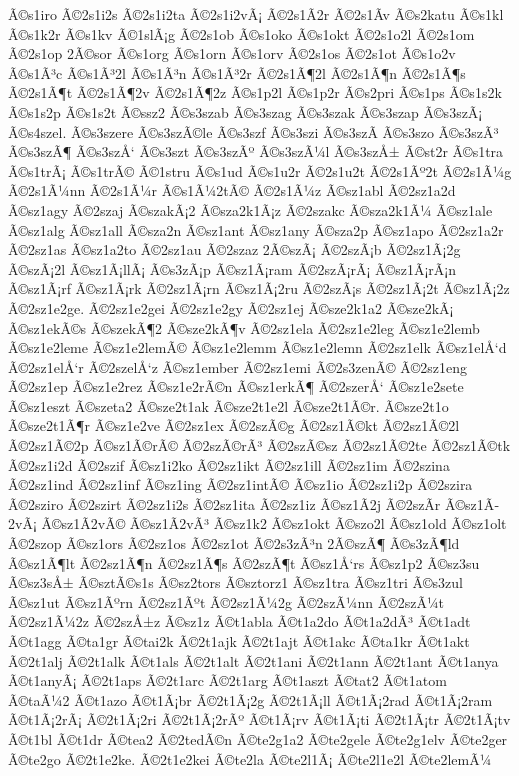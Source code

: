 {Ã©s1iro
Ã©2s1i2s
Ã©2s1i2ta
Ã©2s1i2vÃ¡
Ã©2s1Ã­2r
Ã©2s1Ã­v
Ã©s2katu
Ã©s1kl
Ã©s1k2r
Ã©s1kv
Ã©1slÃ¡g
Ã©2s1ob
Ã©s1oko
Ã©s1okt
Ã©2s1o2l
Ã©2s1om
Ã©2s1op
2Ã©sor
Ã©s1org
Ã©s1orn
Ã©s1orv
Ã©2s1os
Ã©2s1ot
Ã©s1o2v
Ã©s1Ã³c
Ã©s1Ã³2l
Ã©s1Ã³n
Ã©s1Ã³2r
Ã©2s1Ã¶2l
Ã©2s1Ã¶n
Ã©2s1Ã¶s
Ã©2s1Ã¶t
Ã©2s1Ã¶2v
Ã©2s1Ã¶2z
Ã©s1p2l
Ã©s1p2r
Ã©s2pri
Ã©s1ps
Ã©s1s2k
Ã©s1s2p
Ã©s1s2t
Ã©ssz2
Ã©s3szab
Ã©s3szag
Ã©s3szak
Ã©s3szap
Ã©s3szÃ¡
Ã©s4szel.
Ã©s3szere
Ã©s3szÃ©le
Ã©s3szf
Ã©s3szi
Ã©s3szÃ­
Ã©s3szo
Ã©s3szÃ³
Ã©s3szÃ¶
Ã©s3szÅ‘
Ã©s3szt
Ã©s3szÃº
Ã©s3szÃ¼l
Ã©s3szÅ±
Ã©st2r
Ã©s1tra
Ã©s1trÃ¡
Ã©s1trÃ©
Ã©1stru
Ã©s1ud
Ã©s1u2r
Ã©2s1u2t
Ã©2s1Ãº2t
Ã©2s1Ã¼g
Ã©2s1Ã¼nn
Ã©2s1Ã¼r
Ã©s1Ã¼2tÃ©
Ã©2s1Ã¼z
Ã©sz1abl
Ã©2sz1a2d
Ã©sz1agy
Ã©2szaj
Ã©szakÃ¡2
Ã©sza2k1Ã¡z
Ã©2szakc
Ã©sza2k1Ã¼
Ã©sz1ale
Ã©sz1alg
Ã©sz1all
Ã©sza2n
Ã©sz1ant
Ã©sz1any
Ã©sza2p
Ã©sz1apo
Ã©2sz1a2r
Ã©2sz1as
Ã©sz1a2to
Ã©2sz1au
Ã©2szaz
2Ã©szÃ¡
Ã©2szÃ¡b
Ã©2sz1Ã¡2g
Ã©szÃ¡2l
Ã©sz1Ã¡llÃ¡
Ã©s3zÃ¡p
Ã©sz1Ã¡ram
Ã©2szÃ¡rÃ¡
Ã©sz1Ã¡rÃ¡n
Ã©sz1Ã¡rf
Ã©sz1Ã¡rk
Ã©2sz1Ã¡rn
Ã©sz1Ã¡2ru
Ã©2szÃ¡s
Ã©2sz1Ã¡2t
Ã©sz1Ã¡2z
Ã©2sz1e2ge.
Ã©2sz1e2gei
Ã©2sz1e2gy
Ã©2sz1ej
Ã©sze2k1a2
Ã©sze2kÃ¡
Ã©sz1ekÃ©s
Ã©szekÃ¶2
Ã©sze2kÃ¶v
Ã©2sz1ela
Ã©2sz1e2leg
Ã©sz1e2lemb
Ã©sz1e2leme
Ã©sz1e2lemÃ©
Ã©sz1e2lemm
Ã©sz1e2lemn
Ã©2sz1elk
Ã©sz1elÅ‘d
Ã©2sz1elÅ‘r
Ã©2szelÅ‘z
Ã©sz1ember
Ã©2sz1emi
Ã©2s3zenÃ©
Ã©2sz1eng
Ã©2sz1ep
Ã©sz1e2rez
Ã©sz1e2rÃ©n
Ã©sz1erkÃ¶
Ã©2szerÅ‘
Ã©sz1e2sete
Ã©sz1eszt
Ã©szeta2
Ã©sze2t1ak
Ã©sze2t1e2l
Ã©sze2t1Ã©r.
Ã©sze2t1o
Ã©sze2t1Ã¶r
Ã©sz1e2ve
Ã©2sz1ex
Ã©2szÃ©g
Ã©2sz1Ã©kt
Ã©2sz1Ã©2l
Ã©2sz1Ã©2p
Ã©sz1Ã©rÃ©
Ã©2szÃ©rÃ³
Ã©2szÃ©sz
Ã©2sz1Ã©2te
Ã©2sz1Ã©tk
Ã©2sz1i2d
Ã©2szif
Ã©sz1i2ko
Ã©2sz1ikt
Ã©2sz1ill
Ã©2sz1im
Ã©2szina
Ã©2sz1ind
Ã©2sz1inf
Ã©sz1ing
Ã©2sz1intÃ©
Ã©sz1io
Ã©2sz1i2p
Ã©2szira
Ã©2sziro
Ã©2szirt
Ã©2sz1i2s
Ã©2sz1ita
Ã©2sz1iz
Ã©sz1Ã­2j
Ã©2szÃ­r
Ã©sz1Ã­2vÃ¡
Ã©sz1Ã­2vÃ©
Ã©sz1Ã­2vÃ³
Ã©sz1k2
Ã©sz1okt
Ã©szo2l
Ã©sz1old
Ã©sz1olt
Ã©2szop
Ã©sz1ors
Ã©2sz1os
Ã©2sz1ot
Ã©2s3zÃ³n
2Ã©szÃ¶
Ã©s3zÃ¶ld
Ã©sz1Ã¶lt
Ã©2sz1Ã¶n
Ã©2sz1Ã¶s
Ã©2szÃ¶t
Ã©sz1Å‘rs
Ã©sz1p2
Ã©sz3su
Ã©sz3sÅ±
Ã©sztÃ©s1s
Ã©sz2tors
Ã©sztorz1
Ã©sz1tra
Ã©sz1tri
Ã©s3zul
Ã©sz1ut
Ã©sz1Ãºrn
Ã©2sz1Ãºt
Ã©2sz1Ã¼2g
Ã©2szÃ¼nn
Ã©2szÃ¼t
Ã©2sz1Ã¼2z
Ã©2szÅ±z
Ã©sz1z
Ã©t1abla
Ã©t1a2do
Ã©t1a2dÃ³
Ã©t1adt
Ã©t1agg
Ã©ta1gr
Ã©tai2k
Ã©2t1ajk
Ã©2t1ajt
Ã©t1akc
Ã©ta1kr
Ã©t1akt
Ã©2t1alj
Ã©2t1alk
Ã©t1als
Ã©2t1alt
Ã©2t1ani
Ã©2t1ann
Ã©2t1ant
Ã©t1anya
Ã©t1anyÃ¡
Ã©2t1aps
Ã©2t1arc
Ã©2t1arg
Ã©t1aszt
Ã©tat2
Ã©t1atom
Ã©taÃ¼2
Ã©t1azo
Ã©t1Ã¡br
Ã©2t1Ã¡2g
Ã©2t1Ã¡ll
Ã©t1Ã¡2rad
Ã©t1Ã¡2ram
Ã©t1Ã¡2rÃ¡
Ã©2t1Ã¡2ri
Ã©2t1Ã¡2rÃº
Ã©t1Ã¡rv
Ã©t1Ã¡ti
Ã©2t1Ã¡tr
Ã©2t1Ã¡tv
Ã©t1bl
Ã©t1dr
Ã©tea2
Ã©2tedÃ©n
Ã©te2g1a2
Ã©te2gele
Ã©te2g1elv
Ã©te2ger
Ã©te2go
Ã©2t1e2ke.
Ã©2t1e2kei
Ã©te2la
Ã©te2l1Ã¡
Ã©te2l1e2l
Ã©te2lemÃ¼
}
